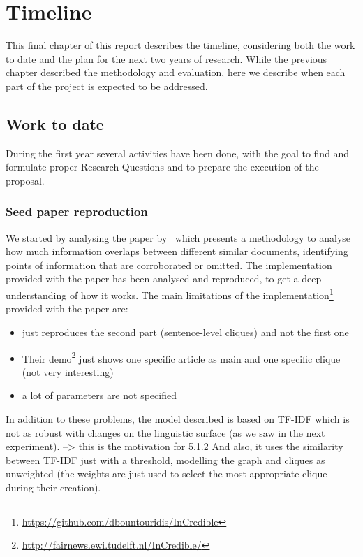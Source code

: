 \chapter{Timeline}
\label{chap:plan}

This final chapter of this report describes the timeline, considering both the work to date and the plan for the next two years of research.
While the previous chapter described the methodology and evaluation, here we describe when each part of the project is expected to be addressed.

\section{Work to date}

During the first year several activities have been done, with the goal to find and formulate proper Research Questions and to prepare the execution of the proposal.


\subsection{Seed paper reproduction}
We started by analysing the paper by~\citet{bountouridis2018explaining} which presents a methodology to analyse how much information overlaps between different similar documents, identifying points of information that are corroborated or omitted.
The implementation provided with the paper has been analysed and reproduced, to get a deep understanding of how it works.
The main limitations of the implementation\footnote{\url{https://github.com/dbountouridis/InCredible}} provided with the paper are:

\begin{itemize}
    \item just reproduces the second part (sentence-level cliques) and not the first one
    \item Their demo\footnote{\url{http://fairnews.ewi.tudelft.nl/InCredible/}} just shows one specific article as main and one specific clique (not very interesting)
    \item a lot of parameters are not specified
\end{itemize}



In addition to these problems, the model described is based on TF-IDF which is not as robust with changes on the linguistic surface (as we saw in the next experiment). --> this is the motivation for 5.1.2
And also, it uses the similarity between TF-IDF just with a threshold, modelling the graph and cliques as unweighted (the weights are just used to select the most appropriate clique during their creation).

